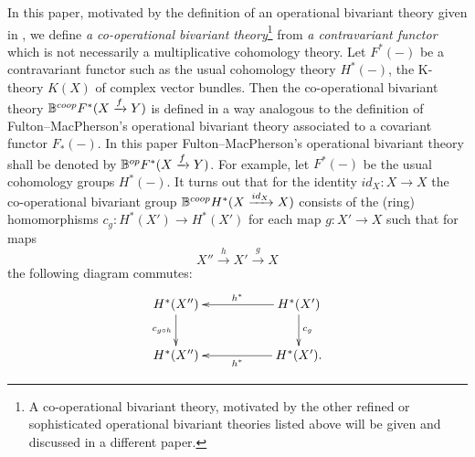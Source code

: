 \documentclass[a4paper]{amsart}
\begin{document}
In this paper, motivated by the definition of an operational bivariant theory given in \cite[\S 8.1]{FM}, we define \emph{a co-operational bivariant theory}\footnote{A co-operational bivariant theory, motivated by the other refined or sophisticated operational bivariant theories listed above will be given and discussed in a different paper.} from \emph{a contravariant functor} which is not necessarily a multiplicative cohomology theory. Let $F^*(-)$ be a contravariant functor such as the usual cohomology theory $H^*(-)$, the K-theory $K(X)$ of complex vector bundles. Then the co-operational bivariant theory $\mathbb B^{coop}F^*(X \xrightarrow f Y)$ is defined in a way analogous to the definition of Fulton--MacPherson's operational bivariant theory associated to a covariant functor $F_*(-)$. In this paper Fulton--MacPherson's operational bivariant theory shall be denoted by $\mathbb B^{op}F^*(X \xrightarrow f Y)$. For example, let $F^*(-)$ be the usual cohomology groups $H^*(-)$. It turns out that for the identity $id_X:X \to X$ the co-operational bivariant group $\mathbb B^{coop}H^*(X \xrightarrow {id_X} X)$ consists of the (ring) homomorphisms $c_g: H^*(X') \to H^*(X')$ for each map $g:X' \to X$ such that for maps 
\begin{equation}\label{maps}
X'' \xrightarrow h X' \xrightarrow g X
\end{equation}
the following diagram commutes:
\begin{equation}\label{cd1}
\xymatrix
{H^*(X'') \ar[d]_{c_{g \circ h}} && H^*(X')\ar[ll]_{h^*} \ar[d]^{c_g}\\
H^*(X'') && H^*(X') \ar[ll]^{h^*}.
}
\end{equation}
\end{document}
